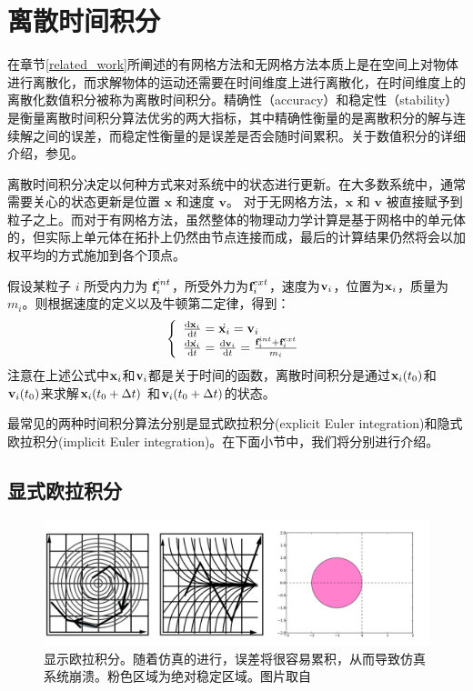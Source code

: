 \section{离散时间积分}
\label{numerical_method}
在章节\ref{related_work}所阐述的有网格方法和无网格方法本质上是在空间上对物体进行离散化，而求解物体的运动还需要在时间维度上进行离散化，在时间维度上的离散化数值积分被称为离散时间积分。精确性（accuracy）和稳定性（stability）是衡量离散时间积分算法优劣的两大指标，其中精确性衡量的是离散积分的解与连续解之间的误差，而稳定性衡量的是误差是否会随时间累积。关于数值积分的详细介绍，参见。

离散时间积分决定以何种方式来对系统中的状态进行更新。在大多数系统中，通常需要关心的状态更新是位置 $\textbf{x}$ 和速度 $\textbf{v}$。 对于无网格方法，$\textbf{x}$ 和 $\textbf{v}$ 被直接赋予到粒子之上。而对于有网格方法，虽然整体的物理动力学计算是基于网格中的单元体的，但实际上单元体在拓扑上仍然由节点连接而成，最后的计算结果仍然将会以加权平均的方式施加到各个顶点。

假设某粒子 $i$ 所受内力为 $\textbf{f}_i^{int}$，所受外力为$\textbf{f}_i^{ext}$，速度为$\textbf{v}_i$，位置为$\textbf{x}_i$，质量为 $m_i$。则根据速度的定义以及牛顿第二定律，得到：
\begin{equation}
\label{eq1}
\left\{ \begin{array}{l}
\frac{\textrm{d}\textbf{x}_i}{\textrm{d}t} = \dot{\textbf{x}_i}=\textbf{v}_i\\
\frac{\textrm{d}\dot{\textbf{x}_i}}{\textrm{d}t} = \frac{\textrm{d}\textbf{v}_i}{\textrm{d}t}=\frac{\textbf{f}_i^{int} + \textbf{f}_i^{ext}}{m_i}
\end{array} \right.
\end{equation}
注意在上述公式中$\textbf{x}_i$和$\textbf{v}_i$都是关于时间的函数，离散时间积分是通过$\textbf{x}_i(t_0)$和$\textbf{v}_i(t_0)$来求解$\textbf{x}_i(t_0 + \Delta t)$ 和$\textbf{v}_i(t_0 + \Delta t)$的状态。

最常见的两种时间积分算法分别是显式欧拉积分(explicit Euler integration)和隐式欧拉积分(implicit Euler integration)。在下面小节中，我们将分别进行介绍。

\subsection{显式欧拉积分}
\label{explicit_euler_method}

\begin{figure}[!htb]
  \centering
  \captionsetup{justification=centering}
  \includegraphics[width=\linewidth]{chap/image/explicit_method}

  \caption{\label{explicit_method}
           显示欧拉积分。随着仿真的进行，误差将很容易累积，从而导致仿真系统崩溃。粉色区域为绝对稳定区域。图片取自
          }
\end{figure}


